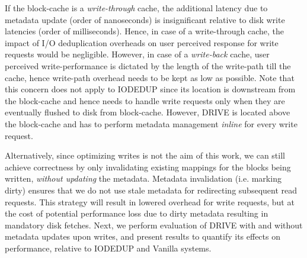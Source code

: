 If the block-cache is a \textit{write-through} cache, the additional latency
due to metadata update (order of nanoseconds) is insignificant
relative to disk write latencies (order of milliseconds). Hence, in
case of a write-through cache, the impact of I/O deduplication overheads
on user perceived response for write requests would
be negligible. However, in case of a \textit{write-back} cache,
user perceived write-performance is dictated by the length of the
write-path till the cache, hence write-path overhead needs to be kept
as low as possible. Note that this concern does not apply to IODEDUP since
its location is downstream from the block-cache and hence needs to
handle write requests only when they are eventually flushed to disk
from block-cache. However, DRIVE is located above the
block-cache and has to perform metadata management \textit{inline} for
every write request.

Alternatively, since optimizing writes is not the aim of this work, we
can still achieve correctness by only invalidating existing mappings
for the blocks being written, \textit{without updating} the metadata.
Metadata invalidation (i.e. marking dirty) ensures that we
do not use stale metadata for redirecting subsequent read requests.
This strategy will result in lowered overhead for write requests,
but at the cost of potential performance loss due to dirty metadata 
resulting in mandatory disk fetches.
Next, we perform evaluation of DRIVE with and without metadata updates 
upon writes,
and present results to quantify its effects on performance, relative to
IODEDUP and Vanilla systems.

